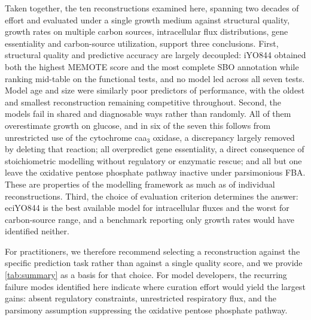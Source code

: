 \documentclass[11pt, a4paper]{article}
\begin{document}
Taken together, the ten reconstructions examined here, spanning two decades of effort and evaluated under a single growth medium against structural quality, growth rates on multiple carbon sources, intracellular flux distributions, gene essentiality and carbon-source utilization, support three conclusions. First, structural quality and predictive accuracy are largely decoupled: iYO844 obtained both the highest MEMOTE score and the most complete SBO annotation while ranking mid-table on the functional tests, and no model led across all seven tests. Model age and size were similarly poor predictors of performance, with the oldest and smallest reconstruction remaining competitive throughout. Second, the models fail in shared and diagnosable ways rather than randomly. All of them overestimate growth on glucose, and in six of the seven this follows from unrestricted use of the cytochrome caa$_3$ oxidase, a discrepancy largely removed by deleting that reaction; all overpredict gene essentiality, a direct consequence of stoichiometric modelling without regulatory or enzymatic rescue; and all but one leave the oxidative pentose phosphate pathway inactive under parsimonious FBA. These are properties of the modelling framework as much as of individual reconstructions. Third, the choice of evaluation criterion determines the answer: eciYO844 is the best available model for intracellular fluxes and the worst for carbon-source range, and a benchmark reporting only growth rates would have identified neither.

For practitioners, we therefore recommend selecting a reconstruction against the specific prediction task rather than against a single quality score, and we provide \autoref{tab:summary} as a basis for that choice. For model developers, the recurring failure modes identified here indicate where curation effort would yield the largest gains: absent regulatory constraints, unrestricted respiratory flux, and the parsimony assumption suppressing the oxidative pentose phosphate pathway.

\printbibliography
\end{document}
